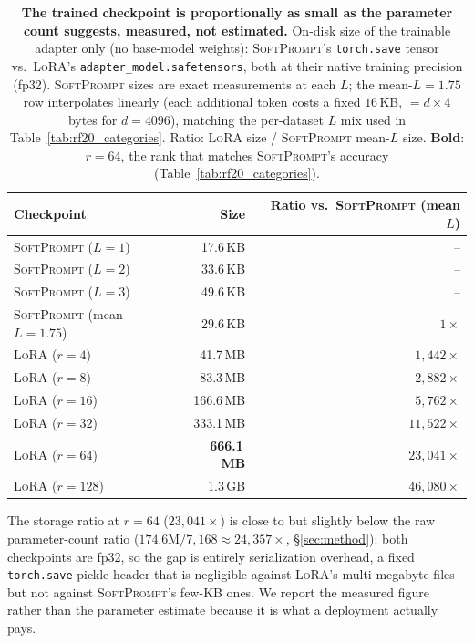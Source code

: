 \documentclass{article}
\newcommand{\ours}{\textsc{SoftPrompt}}
\newcommand{\lora}{\textsc{LoRA}}
\newcommand{\best}[1]{\textbf{#1}}
\begin{document}
\begin{table}[h]
  \centering
  \caption{\textbf{The trained checkpoint is proportionally as small as the parameter count suggests, measured, not estimated.}
    On-disk size of the trainable adapter only (no base-model weights): \ours{}'s \texttt{torch.save} tensor vs.\ \lora{}'s \texttt{adapter\_model.safetensors}, both at their native training precision (fp32).
    \ours{} sizes are exact measurements at each $L$; the mean-$L{=}1.75$ row interpolates linearly (each additional token costs a fixed $16$\,KB, $=d{\times}4$ bytes for $d{=}4096$), matching the per-dataset $L$ mix used in Table~\ref{tab:rf20_categories}.
    Ratio: \lora{} size / \ours{} mean-$L$ size.
    \best{Bold}: $r{=}64$, the rank that matches \ours{}'s accuracy (Table~\ref{tab:rf20_categories}).}
  \label{tab:storage}
  \small
  \begin{tabular}{lrr}
    \toprule
    Checkpoint & Size & Ratio vs.\ \ours{} (mean $L$) \\
    \midrule
    \ours{} ($L{=}1$)              &  17.6\,KB & -- \\
    \ours{} ($L{=}2$)              &  33.6\,KB & -- \\
    \ours{} ($L{=}3$)              &  49.6\,KB & -- \\
    \ours{} (mean $L{=}1.75$)      &  29.6\,KB & $1\times$ \\
    \midrule
    \lora{} ($r{=}4$)              &  41.7\,MB & $1{,}442\times$ \\
    \lora{} ($r{=}8$)              &  83.3\,MB & $2{,}882\times$ \\
    \lora{} ($r{=}16$)             & 166.6\,MB & $5{,}762\times$ \\
    \lora{} ($r{=}32$)             & 333.1\,MB & $11{,}522\times$ \\
    \lora{} ($r{=}64$)             & \best{666.1\,MB} & \best{$23{,}041\times$} \\
    \lora{} ($r{=}128$)            &   1.3\,GB & $46{,}080\times$ \\
    \bottomrule
  \end{tabular}
\end{table}

The storage ratio at $r{=}64$ ($23{,}041\times$) is close to but slightly below the raw parameter-count ratio ($174.6\text{M}/7{,}168 \approx 24{,}357\times$, \S\ref{sec:method}): both checkpoints are fp32, so the gap is entirely serialization overhead, a fixed \texttt{torch.save} pickle header that is negligible against \lora{}'s multi-megabyte files but not against \ours{}'s few-KB ones.
We report the measured figure rather than the parameter estimate because it is what a deployment actually pays.
\end{document}
